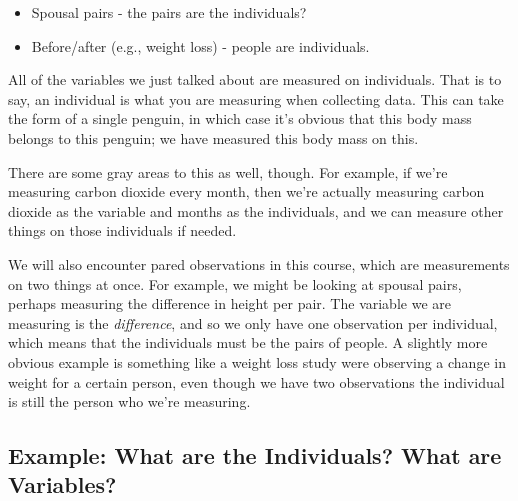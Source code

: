 \documentclass[
  letterpaper,
  DIV=11,
  numbers=noendperiod]{scrreprt}
\providecommand{\tightlist}{%
  \setlength{\itemsep}{0pt}\setlength{\parskip}{0pt}}\usepackage{longtable,booktabs,array}
\begin{document}
\begin{tcolorbox}[enhanced jigsaw, toptitle=1mm, colbacktitle=quarto-callout-warning-color!10!white, breakable, leftrule=.75mm, left=2mm, opacityback=0, colframe=quarto-callout-warning-color-frame, rightrule=.15mm, toprule=.15mm, bottomtitle=1mm, titlerule=0mm, title=\textcolor{quarto-callout-warning-color}{\faExclamationTriangle}\hspace{0.5em}{Paired Observations}, arc=.35mm, colback=white, bottomrule=.15mm, opacitybacktitle=0.6, coltitle=black]

\begin{itemize}
\tightlist
\item
  Spousal pairs - the pairs are the individuals?
\item
  Before/after (e.g., weight loss) - people are individuals.
\end{itemize}

\end{tcolorbox}

All of the variables we just talked about are measured on individuals.
That is to say, an individual is what you are measuring when collecting
data. This can take the form of a single penguin, in which case it's
obvious that this body mass belongs to this penguin; we have measured
this body mass on this.

There are some gray areas to this as well, though. For example, if we're
measuring carbon dioxide every month, then we're actually measuring
carbon dioxide as the variable and months as the individuals, and we can
measure other things on those individuals if needed.

We will also encounter pared observations in this course, which are
measurements on two things at once. For example, we might be looking at
spousal pairs, perhaps measuring the difference in height per pair. The
variable we are measuring is the \emph{difference}, and so we only have
one observation per individual, which means that the individuals must be
the pairs of people. A slightly more obvious example is something like a
weight loss study were observing a change in weight for a certain
person, even though we have two observations the individual is still the
person who we're measuring.

\hypertarget{example-what-are-the-individuals-what-are-variables}{%
\subsection{Example: What are the Individuals? What are
Variables?}\label{example-what-are-the-individuals-what-are-variables}}
\end{document}
